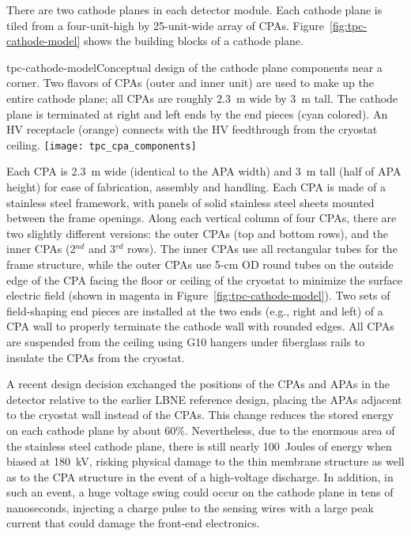 There are two cathode planes in each detector module.  Each cathode plane is 
tiled from a four-unit-high by 25-unit-wide array of CPAs. Figure~\ref{fig:tpc-cathode-model} shows the
building blocks of a cathode plane.  
\begin{cdrfigure} 
{tpc-cathode-model}{Conceptual design of the cathode plane 
components near a corner.  Two flavors of CPAs (outer 
and inner unit) are used to make up the entire cathode plane; all
CPAs are roughly 2.3~m wide by 3~m tall. 
The cathode plane is terminated at
right and left ends by the end pieces (cyan colored).  An HV receptacle 
(orange) connects with the HV feedthrough from the cryostat ceiling. }
\texttt{[image: tpc\_cpa\_components]}
\end{cdrfigure}

Each CPA is 2.3~m wide (identical to the APA width) and 3~m tall (half
of APA height) for ease of fabrication, assembly and handling.  Each
CPA is made of a stainless steel framework, with panels of solid
stainless steel sheets mounted between the frame openings.  Along each
vertical column of four CPAs, there are two slightly different
versions: the outer CPAs (top and bottom rows), and the inner CPAs
(2$^{nd}$ and 3$^{rd}$ rows).  The inner CPAs use all rectangular
tubes for the frame structure, while the outer CPAs use 5-cm OD round
tubes on the outside edge of the CPA facing the floor or ceiling of
the cryostat to minimize the surface electric field (shown in magenta in
  Figure~\ref{fig:tpc-cathode-model}).  Two sets of field-shaping
end pieces are installed at the two ends (e.g., right and left) of a
CPA wall to properly terminate the cathode wall with rounded edges.
All CPAs are suspended from the ceiling using G10 hangers under
fiberglass rails to insulate the CPAs from the cryostat.

A recent design decision exchanged the positions of the CPAs and APAs
in the detector relative to the earlier LBNE reference design, placing
the APAs adjacent to the cryostat wall instead of the CPAs.  This
change reduces the stored energy on each cathode plane by about 60\%.
Nevertheless, due to the enormous area of the stainless steel cathode
plane, there is still nearly 100~Joules of energy when biased at
180~kV, risking physical damage to the thin membrane structure as well
as to the CPA structure in the event of a high-voltage discharge.  In
addition, in such an event, a huge voltage swing could occur on the
cathode plane in tens of nanoseconds, injecting a charge pulse to the
sensing wires with a large peak current that could damage the
front-end electronics.

